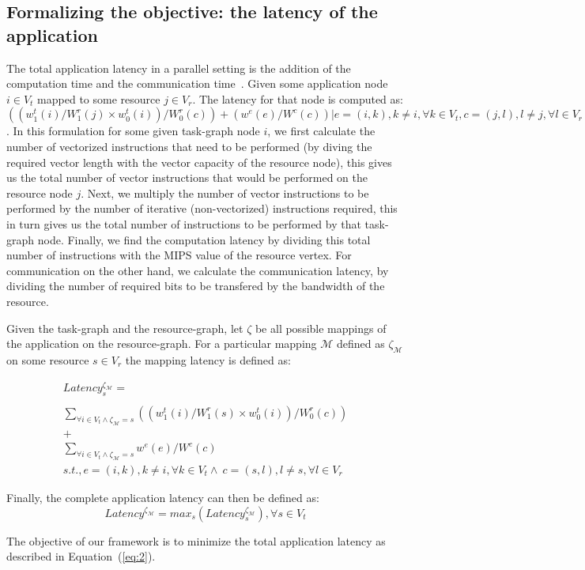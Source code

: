 \subsection{Formalizing the objective: the latency of the application}
\label{sec:form-latency-appl}

The total application latency in a parallel setting is the addition of
the computation time and the communication
time~\cite{ssan05,ajai04}. Given some application node $i \in V_t$
mapped to some resource $j \in V_r$. The latency for that node is
computed as: $((w^t_1(i)/W^r_1(j)\times w^t_0(i))/W^r_0(c))+
(w^e(e)/W^c(c)) | e = (i,k), k \neq i, \forall k \in V_t, c = (j,l), l
\neq j, \forall l \in V_r $. In this formulation for some given
task-graph node $i$, we first calculate the number of vectorized
instructions that need to be performed (by diving the required vector
length with the vector capacity of the resource node), this gives us the
total number of vector instructions that would be performed on the
resource node $j$. Next, we multiply the number of vector instructions
to be performed by the number of iterative (non-vectorized) instructions
required, this in turn gives us the total number of instructions to be
performed by that task-graph node. Finally, we find the computation
latency by dividing this total number of instructions with the MIPS
value of the resource vertex. For communication on the other hand, we
calculate the communication latency, by dividing the number of required
bits to be transfered by the bandwidth of the resource.

Given the task-graph and the resource-graph, let $\zeta$ be all possible
mappings of the application on the resource-graph. For a particular
mapping $\mathcal{M}$ defined as $\zeta_\mathcal{M}$ on some resource $s
\in V_r$ the mapping latency is defined as:

\begin{equation}
  \begin{array}{c}
    Latency^{\zeta_\mathcal{M}}_s = \\
    \\
    \sum_{\forall i \in V_t \wedge
      \zeta_\mathcal{M} = s} ((w^t_1(i)/W^r_1(s)\times w^t_0(i))/W^r_0(c))
    \\
    +
    \\
    \sum_{\forall i \in V_t \wedge
      \zeta_\mathcal{M} = s} w^e(e) / W^c(c)\\ 
    s.t., e = (i,k), k \neq i, \forall k
    \in V_t \wedge\  c = (s,l), l \neq s, \forall l \in V_r
  \end{array}
  \label{eq:1}
\end{equation}

Finally, the complete application latency can then be defined as: 
\begin{equation}
  \tag{OBJECTIVE\_FUNCTION}
  \label{eq:2}
  Latency^{\zeta_\mathcal{M}} = max_{s}
  ({Latency^{\zeta_\mathcal{M}}_s}), \forall s \in V_t
\end{equation}

The objective of our framework is to minimize the total application
latency as described in Equation~(\ref{eq:2}).

